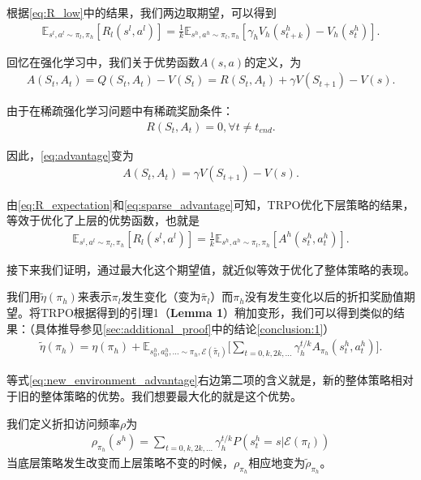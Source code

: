 根据\eqref{eq:R_low}中的结果，我们两边取期望，可以得到
\begin{align}
  \mathbb{E}_{s^l, a^l \sim \pi_l, \pi_h}[R_l(s^l, a^l)] = \frac{1}{k} \mathbb{E}_{s^h, a^h \sim \pi_l, \pi_h}[\gamma_h V_h(s_{t + k}^h) - V_h(s_{t}^h)].
  \label{eq:R_expectation}
\end{align}

回忆在强化学习中，我们关于优势函数$A(s, a)$的定义，为
\begin{align}
  A(S_t, A_t) = Q(S_t, A_t) - V(S_t) = R(S_t, A_t) + \gamma V(S_{t + 1}) - V(s).
  \label{eq:advantage}
\end{align}

由于在稀疏强化学习问题中有稀疏奖励条件：
\begin{align}
  R(S_t, A_t) = 0, \forall t \neq t_{end}.
  \label{eq:sparse_reward_condition}
\end{align}

因此，\eqref{eq:advantage}变为
\begin{align}
  A(S_t, A_t) = \gamma V(S_{t + 1}) - V(s).
  \label{eq:sparse_advantage}
\end{align}

由\eqref{eq:R_expectation}和\eqref{eq:sparse_advantage}可知，TRPO优化下层策略的结果，等效于优化了上层的优势函数，也就是
\begin{align}
  \mathbb{E}_{s^l, a^l \sim \pi_l, \pi_h}[R_l(s^l, a^l)] = \frac{1}{k} \mathbb{E}_{s^h, a^h \sim \pi_l, \pi_h}[A^h(s_t^h, a_t^h)].
  \label{eq:R_expectation_is_advantage}
\end{align}

接下来我们证明，通过最大化这个期望值，就近似等效于优化了整体策略的表现。

我们用$\tilde{\eta}(\pi_h)$来表示$\pi_l$发生变化（变为$\tilde{\pi_l}$）而$\pi_h$没有发生变化以后的折扣奖励值期望。将TRPO根据\cite{TRPO_pre}得到的引理1（\textbf{Lemma 1}）稍加变形，我们可以得到类似的结果：（具体推导参见\ref{sec:additional_proof}中的结论\ref{conclusion:1}）
\begin{align}
  \tilde{\eta}(\pi_h) = \eta(\pi_h) + \mathbb{E}_{s_0^h, a_0^h, ... \sim \pi_h, \mathcal{E}(\tilde{\pi_l})}\Bigg[\sum_{t=0,k,2k,...} \gamma_h^{t/k} A_{\pi_h}(s_t^h, a_t^h)\Bigg].
  \label{eq:new_environment_advantage}
\end{align}

等式\eqref{eq:new_environment_advantage}右边第二项的含义就是，新的整体策略相对于旧的整体策略的优势。我们想要最大化的就是这个优势。

我们定义折扣访问频率$\rho$为
\begin{align}
  \rho_{\pi_h}(s^h) = \sum_{t = 0, k, 2k, ...}\gamma_h^{t/k}P(s_t^h = s|\mathcal{E}(\pi_l))
\end{align}
当底层策略发生改变而上层策略不变的时候，$\rho_{\pi_h}$相应地变为$\tilde{\rho}_{\pi_h}$。

